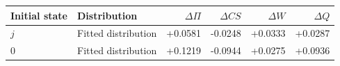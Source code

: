 \begin{tabular}{llrrrr}\toprule
Initial state & Distribution & $\Delta\Pi$ & $\Delta CS$ & $\Delta W$ & $\Delta Q$\\\midrule
$j$ & Fitted distribution & +0.0581 & -0.0248 & +0.0333 & +0.0287 \\
$0$ & Fitted distribution & +0.1219 & -0.0944 & +0.0275 & +0.0936 \\
\bottomrule\end{tabular}
